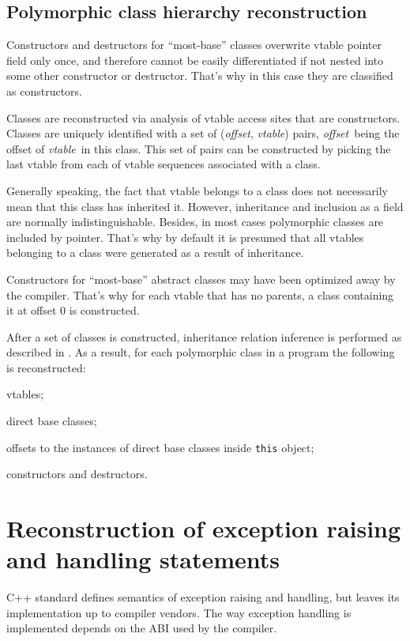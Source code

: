 \documentclass[times, 10pt,twocolumn]{article}
\newcommand{\offset}{\textit{offset}}
\newcommand{\vtable}{\textit{vtable}}
\renewcommand{\~}{{\raise.35ex\hbox{$\scriptstyle\sim$}}}
\renewenvironment{itemize}{
    \begin{list}{\labelitemi}{\itemsep=-\parsep}
}{
	\end{list}
}
\begin{document}
\quad
\subsection{Polymorphic class hierarchy reconstruction}\label{chapterReconstruction}
Constructors and destructors for ``most-base'' classes
overwrite vtable pointer field only once, and therefore
cannot be easily differentiated if not nested into some other
constructor or destructor. That's why in this case they are
classified as constructors.

Classes are reconstructed via analysis of vtable
access sites that are constructors. Classes
are uniquely identified with a set of
(\offset, \vtable) pairs, \offset~being the
offset of \vtable~in this class.
This set of pairs can be constructed by
picking the last vtable from each of
vtable sequences associated with a class.

Generally speaking, the fact that vtable belongs to a class does not
necessarily mean that this class has inherited it.
However, inheritance and inclusion as a field are normally indistinguishable.
Besides, in most cases polymorphic classes are included by pointer.
That's why by default it is presumed that all vtables belonging to
a class were generated as a result of inheritance.

Constructors for ``most-base'' abstract classes
may have been optimized away by the compiler. That's why for each
vtable that has no parents,
a class containing it at offset 0 is constructed.

After a set of classes is constructed, inheritance relation inference
is performed as described in \cite{fokin10}. As a result, for
each polymorphic class in a program the following is reconstructed:
\begin{itemize}
\item vtables;
\item direct base classes;
\item offsets to the instances of direct base classes inside \lstinline{this} object;
\item constructors and destructors.
\end{itemize}




\quad
\section{Reconstruction of exception raising and handling statements}\label{sectionExceptions}
C++ standard defines semantics of exception raising and handling,
but leaves its implementation up to compiler vendors. The way exception handling is
implemented depends on the ABI used by the compiler.
\end{document}
